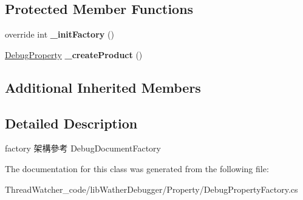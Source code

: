 \subsection*{Protected Member Functions}
\begin{DoxyCompactItemize}
\item 
\hypertarget{classlib_wather_debugger_1_1_property_1_1_debug_property_factory_a94b8224d987df30659ecce1f53e2f1da}{override int {\bfseries \+\_\+init\+Factory} ()}\label{classlib_wather_debugger_1_1_property_1_1_debug_property_factory_a94b8224d987df30659ecce1f53e2f1da}

\item 
\hypertarget{classlib_wather_debugger_1_1_property_1_1_debug_property_factory_aee61aff7a94c3d998fb0afe931ccae06}{\hyperlink{classlib_wather_debugger_1_1_property_1_1_debug_property}{Debug\+Property} {\bfseries \+\_\+create\+Product} ()}\label{classlib_wather_debugger_1_1_property_1_1_debug_property_factory_aee61aff7a94c3d998fb0afe931ccae06}

\end{DoxyCompactItemize}
\subsection*{Additional Inherited Members}


\subsection{Detailed Description}
factory 架構參考 Debug\+Document\+Factory 



The documentation for this class was generated from the following file\+:\begin{DoxyCompactItemize}
\item 
Thread\+Watcher\+\_\+code/lib\+Wather\+Debugger/\+Property/Debug\+Property\+Factory.\+cs\end{DoxyCompactItemize}
